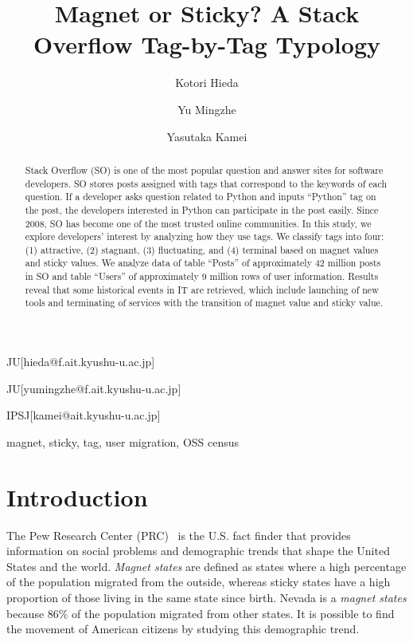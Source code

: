 \documentclass[english,preprint,JIP,technote]{ipsj}
\begin{document}
\title{Magnet or Sticky? A Stack Overflow Tag-by-Tag Typology\\}


\author{Kotori Hieda}{JU}[hieda@f.ait.kyushu-u.ac.jp]
\author{Yu Mingzhe}{JU}[yumingzhe@f.ait.kyushu-u.ac.jp]
\author{Yasutaka Kamei}{IPSJ}[kamei@ait.kyushu-u.ac.jp]

\begin{abstract}
Stack Overflow (SO) is one of the most popular question and answer sites for software developers. SO stores posts assigned with tags that correspond to the keywords of each question. If a developer asks question related to Python and inputs ``Python'' tag on the post, the developers interested in Python can participate in the post easily. Since 2008, SO has become one of the most trusted online communities. In this study, we explore developers' interest by analyzing how they use tags. We classify tags into four: (1) attractive, (2) stagnant, (3) fluctuating, and (4) terminal based on magnet values and sticky values. We analyze data of table ``Posts'' of approximately 42 million posts in SO and table ``Users'' of approximately 9 million rows of user information. Results reveal that some historical events in IT are retrieved, which include launching of new tools and terminating of services with the transition of magnet value and sticky value.
\end{abstract}



\begin{keyword}
magnet, sticky, tag, user migration, OSS census
\end{keyword}


\maketitle

\section{Introduction}
The Pew Research Center (PRC)~\cite{communityeconomic} is the U.S. fact finder that provides information on social problems and demographic trends that shape the United States and the world. \emph{Magnet states} are defined as states where a high percentage of the population migrated from the outside, whereas sticky states have a high proportion of those living in the same state since birth. Nevada is a \emph{magnet states} because  86\% of the population migrated from other states. It is possible to find the movement of American citizens by studying this demographic trend.
\end{document}
